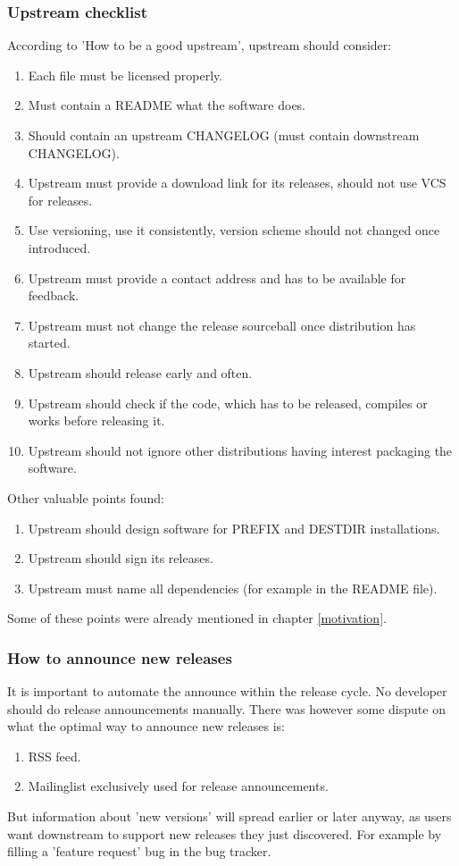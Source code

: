 \documentclass[a4paper,10pt]{article}
\begin{document}
\subsubsection*{Upstream checklist}
According to 'How to be a good upstream', upstream should consider:
\begin{enumerate}
 \item Each file must be licensed properly.
 \item Must contain a README what the software does.
 \item Should contain an upstream CHANGELOG (must contain downstream CHANGELOG).
 \item Upstream must provide a download link for its releases, should not use VCS for releases.
 \item Use versioning, use it consistently, version scheme should not changed once introduced.
 \item Upstream must provide a contact address and has to be available for feedback.
 \item Upstream must not change the release sourceball once distribution has started.
 \item Upstream should release early and often.
 \item Upstream should check if the code, which has to be released, compiles or works before releasing it.
 \item Upstream should not ignore other distributions having interest packaging the software.
\end{enumerate}

Other valuable points found:
\begin{enumerate}
 \item Upstream should design software for PREFIX and DESTDIR installations.
 \item Upstream should sign its releases.
 \item Upstream must name all dependencies (for example in the README file).
\end{enumerate}
Some of these points were already mentioned in chapter \ref{motivation}.

\subsubsection*{How to announce new releases}
It is important to automate the announce within the release cycle. No developer should do release announcements manually. There was however some dispute on what the optimal way to announce new releases is:
\begin{enumerate}
 \item RSS feed.
 \item Mailinglist exclusively used for release announcements.
\end{enumerate}
But information about 'new versions' will spread earlier or later anyway, as users want downstream to support new releases they just discovered. For example by filling a 'feature request' bug in the bug tracker.
\end{document}
